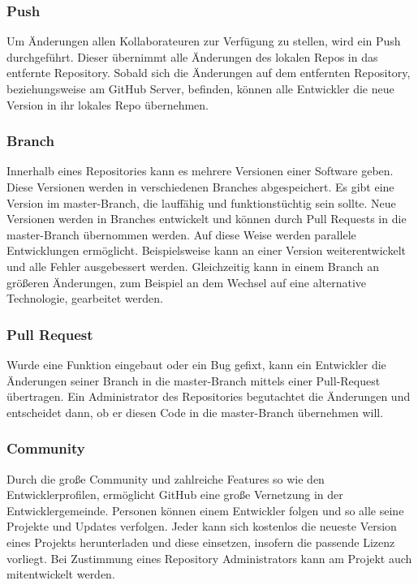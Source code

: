 \documentclass[FIPLY_base.tex]{subfiles}
\begin{document}
\subsubsection{Push}
Um Änderungen allen Kollaborateuren zur Verfügung zu stellen, wird ein Push durchgeführt.
Dieser übernimmt alle Änderungen des lokalen Repos in das entfernte Repository.
Sobald sich die Änderungen auf dem entfernten Repository, beziehungsweise am GitHub Server, befinden, können alle Entwickler die neue Version in ihr lokales Repo übernehmen. 
 
\subsubsection{Branch}
Innerhalb eines Repositories kann es mehrere Versionen einer Software geben. Diese Versionen werden in verschiedenen Branches abgespeichert.
Es gibt eine Version im master-Branch, die lauffähig und funktionstüchtig sein sollte.
Neue Versionen werden in Branches entwickelt und können durch Pull Requests in die master-Branch übernommen werden. 
Auf diese Weise werden parallele Entwicklungen ermöglicht. Beispielsweise kann an einer Version weiterentwickelt und alle Fehler ausgebessert werden.
Gleichzeitig kann in einem Branch an größeren Änderungen, zum Beispiel an dem Wechsel auf eine alternative Technologie, gearbeitet werden.

\subsubsection{Pull Request}
Wurde eine Funktion eingebaut oder ein Bug gefixt, kann ein Entwickler die Änderungen seiner Branch in die master-Branch mittels einer Pull-Request übertragen. 
Ein Administrator des Repositories begutachtet die Änderungen und entscheidet dann, ob er diesen Code in die master-Branch übernehmen will.

\subsubsection{Community}
Durch die große Community und zahlreiche Features so wie den Entwicklerprofilen, ermöglicht GitHub eine große Vernetzung in der Entwicklergemeinde.
Personen können einem Entwickler folgen und so alle seine Projekte und Updates verfolgen.
Jeder kann sich kostenlos die neueste Version eines Projekts herunterladen und diese einsetzen, insofern die passende Lizenz vorliegt. Bei Zustimmung eines Repository Administrators kann am Projekt auch mitentwickelt werden.
\end{document}
